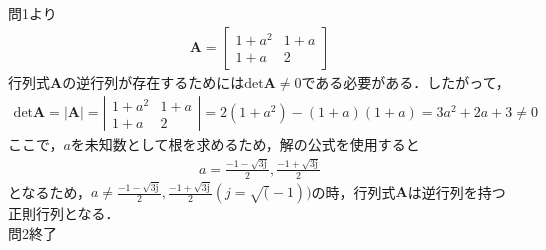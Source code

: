 \documentclass[uplatex,b5j]{jsarticle} %
\begin{document}
\section{}
問1より
\begin{eqnarray} \label{eq:9}
    \boldsymbol{A}=\left[
        \begin{array}{cc}
            1+a^{2} & 1+a \\
            1+a & 2
        \end{array}
    \right]
\end{eqnarray}
行列式$\boldsymbol{A}$の逆行列が存在するためには$\mathrm{det}\boldsymbol{A}\neq0$である必要がある．したがって，
\begin{eqnarray} \label{eq:10}
    \mathrm{det}\boldsymbol{A}=|\boldsymbol{A}|=\left|
        \begin{array}{cc}
            1+a^{2} & 1+a \\
            1+a & 2
        \end{array}
    \right|
    =2(1+a^2)-(1+a)(1+a)
    =3a^2+2a+3\neq0
\end{eqnarray}
ここで，$a$を未知数として根を求めるため，解の公式を使用すると
\begin{eqnarray} \label{eq:11}
    a=\frac{-1-\sqrt{3\mathrm{j}}}{2}, \frac{-1+\sqrt{3\mathrm{j}}}{2}
\end{eqnarray}
となるため，$a\neq\frac{-1-\sqrt{3\mathrm{j}}}{2}, \frac{-1+\sqrt{3\mathrm{j}}}{2}(j=\sqrt(-1))$の時，行列式$\boldsymbol{A}$は逆行列を持つ正則行列となる．\\
問2終了
\end{document}
